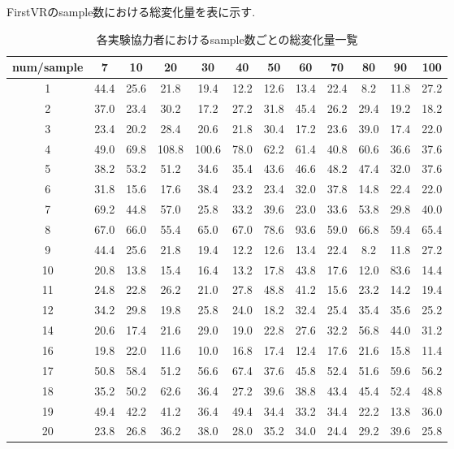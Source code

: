 \documentclass{ltjsreport}
\begin{document}
\clearpage
		FirstVRのsample数における総変化量を表に示す.
		\begin{table}[H]
		\begin{center}
		\caption{各実験協力者におけるsample数ごとの総変化量一覧}
		\label{tab:FVRdata}
		\begin{tabular}{c|ccccccccccc}
			num/sample & 7 & 10 & 20 & 30 & 40 & 50 & 60 & 70 & 80 & 90 & 100 \\ \hline
			1 & 44.4 & 25.6 & 21.8 & 19.4 & 12.2 & 12.6 & 13.4 & 22.4 & 8.2 & 11.8 & 27.2 \\
			2 & 37.0 & 23.4 & 30.2 & 17.2 & 27.2 & 31.8 & 45.4 & 26.2 & 29.4 & 19.2 & 18.2 \\
			3 & 23.4 & 20.2 & 28.4 & 20.6 & 21.8 & 30.4 & 17.2 & 23.6 & 39.0 & 17.4 & 22.0 \\
			4 & 49.0 & 69.8 & 108.8 & 100.6 & 78.0 & 62.2 & 61.4 & 40.8 & 60.6 & 36.6 & 37.6 \\
			5 & 38.2 & 53.2 & 51.2 & 34.6 & 35.4 & 43.6 & 46.6 & 48.2 & 47.4 & 32.0 & 37.6 \\
			6 & 31.8 & 15.6 & 17.6 & 38.4 & 23.2 & 23.4 & 32.0 & 37.8 & 14.8 & 22.4 & 22.0 \\
			7 & 69.2 & 44.8 & 57.0 & 25.8 & 33.2 & 39.6 & 23.0 & 33.6 & 53.8 & 29.8 & 40.0 \\
			8 & 67.0 & 66.0 & 55.4 & 65.0 & 67.0 & 78.6 & 93.6 & 59.0 & 66.8 & 59.4 & 65.4 \\
			9 & 44.4 & 25.6 & 21.8 & 19.4 & 12.2 & 12.6 & 13.4 & 22.4 & 8.2 & 11.8 & 27.2 \\
			10 & 20.8 & 13.8 & 15.4 & 16.4 & 13.2 & 17.8 & 43.8 & 17.6 & 12.0 & 83.6 & 14.4 \\
			11 & 24.8 & 22.8 & 26.2 & 21.0 & 27.8 & 48.8 & 41.2 & 15.6 & 23.2 & 14.2 & 19.4 \\
			12 & 34.2 & 29.8 & 19.8 & 25.8 & 24.0 & 18.2 & 32.4 & 25.4 & 35.4 & 35.6 & 25.2 \\
			14 & 20.6 & 17.4 & 21.6 & 29.0 & 19.0 & 22.8 & 27.6 & 32.2 & 56.8 & 44.0 & 31.2 \\
			16 & 19.8 & 22.0 & 11.6 & 10.0 & 16.8 & 17.4 & 12.4 & 17.6 & 21.6 & 15.8 & 11.4 \\
			17 & 50.8 & 58.4 & 51.2 & 56.6 & 67.4 & 37.6 & 45.8 & 52.4 & 51.6 & 59.6 & 56.2 \\
			18 & 35.2 & 50.2 & 62.6 & 36.4 & 27.2 & 39.6 & 38.8 & 43.4 & 45.4 & 52.4 & 48.8 \\
			19 & 49.4 & 42.2 & 41.2 & 36.4 & 49.4 & 34.4 & 33.2 & 34.4 & 22.2 & 13.8 & 36.0 \\
			20 & 23.8 & 26.8 & 36.2 & 38.0 & 28.0 & 35.2 & 34.0 & 24.4 & 29.2 & 39.6 & 25.8 \\

\end{tabular}
\end{center}
\end{table}
\end{document}
